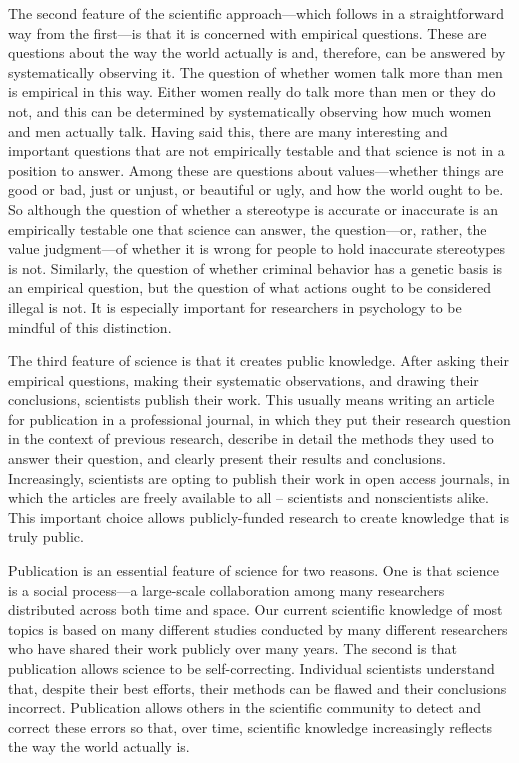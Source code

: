 The second feature of the scientific approach---which follows in a straightforward way from the first---is that it is concerned with empirical questions. These are questions about the way the world actually is and, therefore, can be answered by systematically observing it. The question of whether women talk more than men is empirical in this way. Either women really do talk more than men or they do not, and this can be determined by systematically observing how much women and men actually talk. Having said this, there are many interesting and important questions that are not empirically testable and that science is not in a position to answer. Among these are questions about values---whether things are good or bad, just or unjust, or beautiful or ugly, and how the world ought to be. So although the question of whether a stereotype is accurate or inaccurate is an empirically testable one that science can answer, the question---or, rather, the value judgment---of whether it is wrong for people to hold inaccurate stereotypes is not. Similarly, the question of whether criminal behavior has a genetic basis is an empirical question, but the question of what actions ought to be considered illegal is not. It is especially important for researchers in psychology to be mindful of this distinction.

The third feature of science is that it creates public knowledge. After asking their empirical questions, making their systematic observations, and drawing their conclusions, scientists publish their work. This usually means writing an article for publication in a professional journal, in which they put their research question in the context of previous research, describe in detail the methods they used to answer their question, and clearly present their results and conclusions. Increasingly, scientists are opting to publish their work in open access journals, in which the articles are freely available to all -- scientists and nonscientists alike. This important choice allows publicly-funded research to create knowledge that is truly public.

Publication is an essential feature of science for two reasons. One is that science is a social process---a large-scale collaboration among many researchers distributed across both time and space. Our current scientific knowledge of most topics is based on many different studies conducted by many different researchers who have shared their work publicly over many years. The second is that publication allows science to be self-correcting. Individual scientists understand that, despite their best efforts, their methods can be flawed and their conclusions incorrect. Publication allows others in the scientific community to detect and correct these errors so that, over time, scientific knowledge increasingly reflects the way the world actually is.

